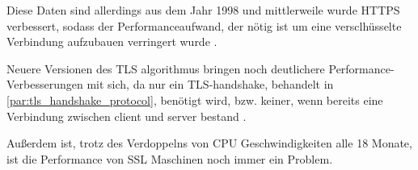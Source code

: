 \begin{table}[htpb]
\caption[Parameter linearer Anpassungen an HTTP- und HTTPS-Übertragungen]{Parameter linearer Anpassungen an HTTP- und HTTPS-Übertragungen\footnotemark}
\label{tab:HTTPS}
\end{table}
Diese Daten sind allerdings aus dem Jahr 1998 und mittlerweile wurde \ac{HTTPS} verbessert, sodass der Performanceaufwand, der nötig ist um eine versclhüsselte Verbindung aufzubauen verringert wurde \autocite[\vglf][]{CloudfareWarumHTTPS:online}.

Neuere Versionen des \ac{TLS} \gls{algorithmus} bringen noch deutlichere Performance-Verbesserungen mit sich, da \uam nur ein \ac{TLS}-\gls{handshake}, behandelt in \autoref{par:tls_handshake_protocol}, benötigt wird, bzw. keiner, wenn bereits eine Verbindung zwischen \gls{client} und \gls{server} bestand \autocite[\vglf][]{CloudfareWarumHTTPS:online}.

Außerdem ist, trotz des Verdoppelns von CPU Geschwindigkeiten alle 18 Monate, ist die Performance von \ac{SSL} Maschinen noch immer ein Problem.\autocite[\vglf][]{cryptoeprint:2006/212}

